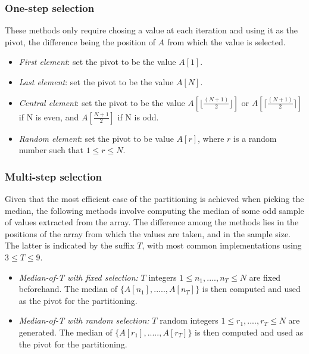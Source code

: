 \documentclass[]{finalproject}
\begin{document}
\subsubsection{One-step selection}
These methods only require chosing a value at each iteration and using it as the pivot, the difference being the position of $A$ from which the value is selected.\\

\begin{itemize}[partopsep=0pt, parsep=0.3pt, topsep=-\parskip, itemsep=1pt]
\item{\textit{First element}}: set the pivot to be the value $A[1]$.\\
\item{\textit{Last element}}: set the pivot to be the value $A[N]$.\\
\item{\textit{Central element}}: set the pivot to be the value $A[\lfloor \frac{(N+1)}{2} \rfloor]$ or $A[\lceil \frac{(N+1)}{2} \rceil]$ if N is even, and $A[\frac{N+1}{2}]$ if N is odd.\\
\item{\textit{Random element}}: set the pivot to be value $A[r]$, where $r$ is a random number such that $1 \leq r \leq N$.
\end{itemize}

\subsubsection{Multi-step selection}
Given that the most efficient case of the partitioning is achieved when picking the median, the following methods involve computing the median of some odd sample of values extracted from the array. The difference among the methods lies in the positions of the array from which the values are taken, and in the sample size. The latter is indicated by the suffix $T$, with most common implementations using $3 \leq T \leq 9$.\\

\begin{itemize}[partopsep=0pt, parsep=0pt, topsep=-\parskip, itemsep=0pt]
\item{\textit{Median-of-T with fixed selection:}} $T$ integers $1 \leq n_{1},....,n_{T} \leq N$ are fixed beforehand. The median of $\{A[n_{1}],.....,A[n_{T}]\}$ is then computed and used as the pivot for the partitioning.\\
\item{\textit{Median-of-T with random selection:}} $T$ random integers $1 \leq r_{1},....,r_{T} \leq N$ are generated. The median of $\{A[r_{1}],.....,A[r_{T}]\}$ is then computed and used as the pivot for the partitioning.
\end{itemize}
\end{document}
